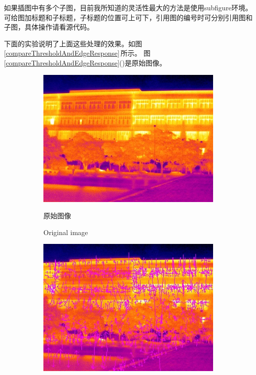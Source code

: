 \documentclass[10.5pt,a4paper]{article}
\numberwithin{equation}{section}
\numberwithin{figure}{section}
\numberwithin{table}{section}
\begin{document}
\par
如果插图中有多个子图，目前我所知道的灵活性最大的方法是使用subfigure环境。
可给图加标题和子标题，子标题的位置可上可下，引用图的编号时可分别引用图和子图，具体操作请看源代码。
\par
下面的实验说明了上面这些处理的效果。如图\,\ref{compareThresholdAndEdgeResponse}\,所示。
图\ref{compareThresholdAndEdgeResponse}()是原始图像。
\begin{figure}[htbp]
\centering
	\begin{subfigure}[b]{.4\textwidth}
		\centering
				\includegraphics[width=\textwidth]{useful/compareEdgeResponse/12.jpg}
				\caption{原始图像\label{originalZhulou}}
				\addtocounter{subfigure}{-1}
				\caption{Original image}
	\end{subfigure}
	\qquad
	\begin{subfigure}[b]{.4\textwidth}
		\centering
				\includegraphics[width=\textwidth]{useful/compareEdgeResponse/siftFeature1301.jpg}

\end{subfigure}
\end{figure}
\end{document}
